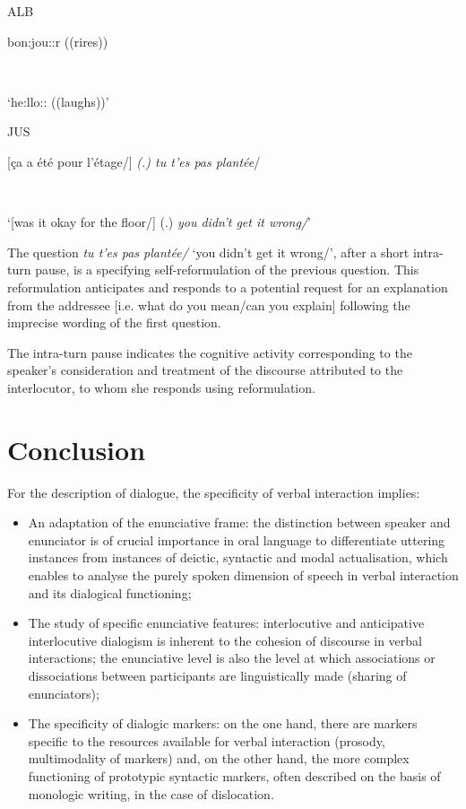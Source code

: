 \documentclass[output=paper]{langscibook}
\begin{document}
\parbox{8mm}{ALB}{bon:jou::r ((rires))}\\
\parbox{8mm}{~}{  ‘he:llo:: ((laughs))’}\medskip

\parbox{8mm}{JUS}{ [ça a été pour l'étage/]} {\textsl{(.)  tu t'es pas plantée}}{/}\\
\parbox{8mm}{~}{  ‘[was it okay for the floor/] (.) \textsl{you didn't get it wrong/}’}{}\\

\z 

The question \textit{tu t’es pas plantée/} ‘you didn't get it wrong/’, after a short intra-turn pause, is a specifying self-reformulation of the previous question. This reformulation anticipates and responds to a potential request for an explanation from the addressee [i.e. what do you mean\slash can you explain] following the imprecise wording of the first question.

\begin{sloppypar}
The intra-turn pause indicates the cognitive activity corresponding to the speaker's consideration and treatment of the discourse attributed to the interlocutor, to whom she responds using reformulation.
\end{sloppypar}

\section{Conclusion}

{For the description of dialogue, the specificity of verbal interaction implies:} 

\begin{itemize}
\item {An adaptation of the enunciative frame: the distinction between speaker and enunciator is of crucial importance in oral language to differentiate uttering instances from instances of deictic, syntactic and modal actualisation, which enables to analyse the purely spoken dimension of speech in verbal interaction and its dialogical functioning;}

\item {The study of specific enunciative features: interlocutive and anticipative interlocutive dialogism is inherent to the cohesion of discourse in verbal interactions; the enunciative level is also the level at} which{ associations or dissociations between participants are linguistically made (sharing of enunciators);}

\item {The specificity of dialogic markers: on the one hand, there are markers specific to the resources available for verbal interaction (prosody, multimodality of markers) and, on the other hand, the more complex functioning of prototypic syntactic markers, often described on the basis of monologic writing, in the case of dislocation.} 

\end{itemize}
\end{document}
